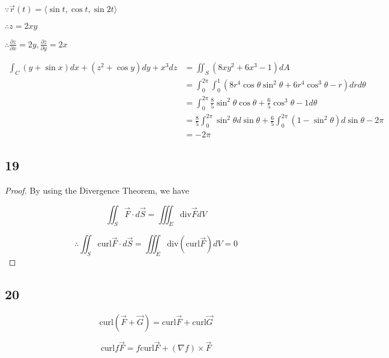 \documentclass{article}
\begin{document}
  $\because \overrightarrow{r}(t) = \langle \sin t, \cos t, \sin 2t \rangle$

  $\therefore z = 2xy$

  $\therefore \frac{\partial z}{\partial x} = 2y, \frac{\partial z}{\partial y} = 2x$

  $$\begin{aligned}
    \int_C (y + \sin x) dx + (z^2 + \cos y) dy + x^3 dz &= \iint_S (8xy^2 + 6x^3 - 1) dA \\
                                                        &= \int_0^{2\pi} \int_0^1 (8r^4 \cos \theta \sin^2 \theta + 6r^4 \cos^3 \theta - r) dr d\theta \\
                                                        &= \int_0^{2\pi}  \frac{8}{5} \sin^2 \theta \cos \theta + \frac{6}{5} \cos^3 \theta - 1 d\theta \\
                                                        &= \frac{8}{5} \int_0^{2\pi} \sin^2 \theta d\sin \theta + \frac{6}{5} \int_0^{2\pi} (1-\sin^2 \theta) d \sin \theta - 2\pi \\
                                                        &= -2\pi
  \end{aligned}
  $$



  \subsection*{19}

  \begin{proof}
    
  By using the Divergence Theorem, we have

  $$\iint_S \overrightarrow{F} \cdot d \overrightarrow{S} = \iiint_E \textrm{div} \overrightarrow{F} dV$$

  $$\therefore \iint_S \textrm{curl} \overrightarrow{F} \cdot d \overrightarrow{S} = \iiint_E \textrm{div} (\textrm{curl} \overrightarrow{F}) dV = 0$$

  \end{proof}


  \subsection*{20}

  $$\textrm{curl} (\overrightarrow F + \overrightarrow G) = \textrm{curl} \overrightarrow F + \textrm{curl} \overrightarrow G$$

  $$\textrm{curl}{f \overrightarrow F} = f \textrm{curl} \overrightarrow F + (\nabla f) \times \overrightarrow F$$
\end{document}
